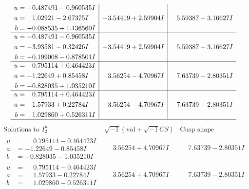 \documentclass[1p]{elsarticle_modified}
\theoremstyle{definition}
\newcommand{\I}{\sqrt{-1}}
\begin{document}
$$\begin{array}{c|c|c}
\begin{aligned}
u &= -0.487491 - 0.960535 I \\
a &= \phantom{-}1.02921 - 2.67375 I \\
b &= -0.088535 + 1.136560 I\end{aligned}
 & -3.54419 + 2.59904 I & \phantom{-}5.59387 - 3.16627 I \\ \hline\begin{aligned}
u &= -0.487491 - 0.960535 I \\
a &= -3.93581 - 0.32426 I \\
b &= -0.199008 - 0.878501 I\end{aligned}
 & -3.54419 + 2.59904 I & \phantom{-}5.59387 - 3.16627 I \\ \hline\begin{aligned}
u &= \phantom{-}0.795114 + 0.464423 I \\
a &= -1.22649 + 0.85458 I \\
b &= -0.828035 + 1.035210 I\end{aligned}
 & \phantom{-}3.56254 - 4.70967 I & \phantom{-}7.63739 + 2.80351 I \\ \hline\begin{aligned}
u &= \phantom{-}0.795114 + 0.464423 I \\
a &= \phantom{-}1.57933 + 0.22784 I \\
b &= \phantom{-}1.029860 + 0.526311 I\end{aligned}
 & \phantom{-}3.56254 - 4.70967 I & \phantom{-}7.63739 + 2.80351 I\\
 \hline 
 \end{array}$$\newpage$$\begin{array}{c|c|c}  
\text{Solutions to }I^u_{2}& \I (\text{vol} + \sqrt{-1}CS) & \text{Cusp shape}\\
 \hline 
\begin{aligned}
u &= \phantom{-}0.795114 - 0.464423 I \\
a &= -1.22649 - 0.85458 I \\
b &= -0.828035 - 1.035210 I\end{aligned}
 & \phantom{-}3.56254 + 4.70967 I & \phantom{-}7.63739 - 2.80351 I \\ \hline\begin{aligned}
u &= \phantom{-}0.795114 - 0.464423 I \\
a &= \phantom{-}1.57933 - 0.22784 I \\
b &= \phantom{-}1.029860 - 0.526311 I\end{aligned}
 & \phantom{-}3.56254 + 4.70967 I & \phantom{-}7.63739 - 2.80351 I \\ \hline\begin{aligned}

\end{aligned}
\end{array}$$
\end{document}
